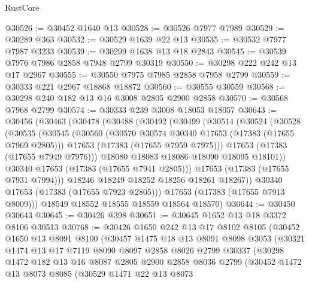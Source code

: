 \begin{lexlean}{RustCore}
\begin{coremodule}
@30526 := @30452 @1640 @13
@30528 := @30526 @7977 @7989
@30529 := @30289 @363
@30532 := @30529 @1639 @22 @13
@30535 := @30532 @7977 @7987 @3233
@30539 := @30299 @1638 @13 @18 @2843
@30545 := @30539 @7976 @7986 @2858 @7948 @2799 @30319
@30550 := @30298 @222 @242 @13 @17 @2967
@30555 := @30550 @7975 @7985 @2858 @7958 @2799
@30559 := @30333 @221 @2967 @18868 @18872
@30560 := @30555 @30559
@30568 := @30298 @240 @182 @13 @16 @3008 @2805 @2900 @2858
@30570 := @30568 @7968 @2799
@30574 := @30333 @239 @3008 @18053 @18057
@30643 := @30456
    (@30463
      (@30478
        (@30488
          (@30492
            (@30499
              (@30514
                (@30524
                  (@30528
                    (@30535
                      (@30545
                        (@30560
                          (@30570 @30574 @30340 @17653 (@17383 (@17655 @7969 @2805)))
                          @17653
                          (@17383 (@17655 @7959 @7975)))
                        @17653
                        (@17383 (@17655 @7949 @7976)))
                      @18080
                      @18083
                      @18086
                      @18090
                      @18095
                      @18101))
                  @30340
                  @17653
                  (@17383 (@17655 @7941 @2805)))
                @17653
                (@17383 (@17655 @7931 @7994)))
              @18246
              @18249
              @18252
              @18256
              @18261
              @18267))
          @30340
          @17653
          (@17383 (@17655 @7923 @2805)))
        @17653
        (@17383 (@17655 @7913 @8009)))
      @18549
      @18552
      @18555
      @18559
      @18564
      @18570)
@30644 := @30450 @30643
@30645 := @30426 @398
@30651 := @30645 @1652 @13 @18 @3372 @8106 @30513
@30768 := @30426
    @1650
    @242
    @13
    @17
    @8102
    @8105
    (@30452
      @1650
      @13
      @8091
      @8100
      (@30457
        @1475
        @18
        @13
        @8091
        @8098
        @3053
        (@30321
          @1474
          @13
          @17
          @7119
          @8090
          @8097
          @2858
          @8026
          @2799
          @30337
          (@30298
            @1472
            @182
            @13
            @16
            @8087
            @2805
            @2900
            @2858
            @8036
            @2799
            (@30452
              @1472
              @13
              @8073
              @8085
              (@30529
                @1471
                @22
                @13
                @8073

\end{coremodule}
\end{lexlean}
